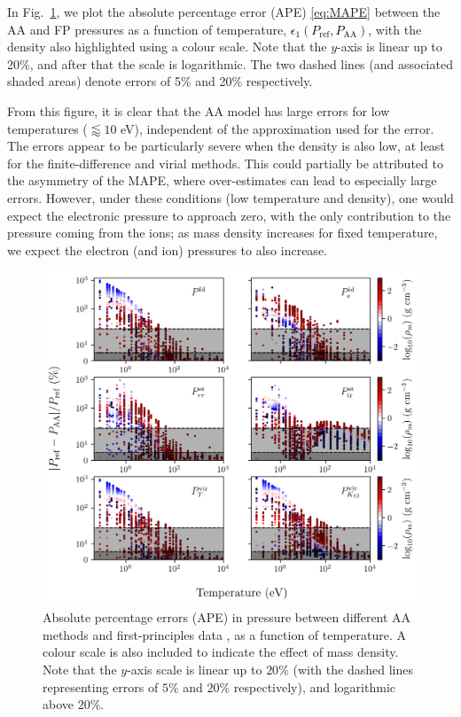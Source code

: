 \documentclass[%
 preprint,
 superscriptaddress,
 amsmath,amssymb,
longbibliography,
]{revtex4-2}
\newcommand{\change}[1]{\textcolor{black}{#1}}
\newcommand{\Pref}{P_\textrm{ref}}
\begin{document}
In Fig.~\ref{fig:aa_error_temp}, we plot the absolute percentage error (APE) \eqref{eq:MAPE} between the AA and FP pressures as a function of temperature, \change{$\epsilon_1(\Pref, P_\textrm{AA})$}, with the density also highlighted using a colour scale. Note that the $y$-axis is linear up to 20\%, and after that the scale is logarithmic. The two dashed lines (and associated shaded areas) denote errors of 5\% and 20\% respectively.

From this figure, it is clear that the AA model has large errors for low temperatures ($\lessapprox 10$ eV), independent of the approximation used for the error. The errors appear to be particularly severe when the density is also low, at least for the finite-difference and virial methods. This could partially be attributed to the asymmetry of the MAPE, where over-estimates can lead to especially large errors. However, under these conditions (low temperature and density), one would expect the electronic pressure to approach zero, with the only contribution to the pressure coming from the ions; as mass density increases for fixed temperature, we expect the electron (and ion) pressures to also increase. 

\begin{figure}
    \centering
    \includegraphics{../figs/error_temp_aa_v6.png}
    \caption{Absolute percentage errors (APE) in pressure between different AA methods and first-principles data \cite{Militzer_EOS_database}, as a function of temperature. A colour scale is also included to indicate the effect of mass density. Note that the $y$-axis scale is linear up to $20\%$ (with the dashed lines representing errors of $5\%$ and $20\%$ respectively), and logarithmic above $20\%$.}
    \label{fig:aa_error_temp}
\end{figure}
\end{document}
